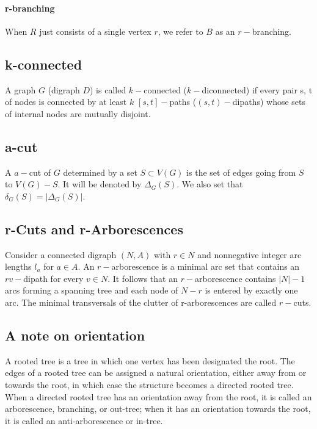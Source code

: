 \documentclass{article}
\begin{document}
\paragraph{r-branching}
When $R$ just consists of a single vertex $r$, we refer to $B$ as an $r-$branching.

\subsection{k-connected}
A graph $G$ (digraph $D$) is called $k-$connected ($k-$diconnected) if every pair
s, t of nodes is connected by at least $k$ $[s, t]-$paths ($(s, t)-$dipaths) whose sets of
internal nodes are mutually disjoint.

\subsection{a-cut}
A $a-$cut of $G$ determined by a set $S \subset V(G)$ is the set of
edges going from $S$ to $V(G) - S$. 
It will be denoted by $\Delta_G(S)$.
We also set that $\delta_G(S) = |\Delta_G(S)|$.

\subsection{r-Cuts and r-Arborescences}

Consider a connected digraph $(N, A)$ with $r \in N$ and nonnegative
integer arc lengths $l_a$ for $a \in A$. An $r-$arborescence is a minimal arc
set that contains an $rv-$dipath for every $v \in N$. 
It follows that an $r-$arborescence contains $|N| - 1$ arcs forming a spanning tree and each
node of $N - {r}$ is entered by exactly one arc.
The minimal transversals of the clutter of r-arborescences are called $r-$cuts.

\subsection{A note on orientation}
A rooted tree is a tree in which one vertex has been designated the root.
The edges of a rooted tree can be assigned a natural orientation, either away from 
or towards the root, in which case the structure becomes a directed rooted tree.
When a directed rooted tree has an orientation away from the root,
 it is called an arborescence, branching, or out-tree;
 when it has an orientation towards the root, 
 it is called an anti-arborescence or in-tree.

\end{document}
